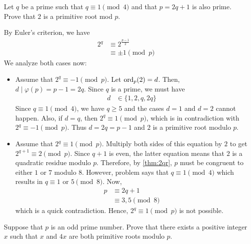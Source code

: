 \documentclass{subfile}
\begin{document}
	\begin{problem}
		Let $q$ be a prime such that $q\equiv 1\pmod 4$ and that $p=2q+1$ is also prime. Prove that $2$ is a primitive root mod $p$.
	\end{problem}

	\begin{solution}
		By Euler's criterion, we have
			\begin{align*}
				2^q
					& \equiv 2^{\frac{p-1}{2}}\\
					& \equiv \pm 1 \pmod{p}
			\end{align*}
		 We analyze both cases now:
			\begin{itemize}
				\item Assume that $2^q \equiv -1 \pmod p$. Let $\operatorname{ord}_p(2)=d$. Then, $d\mid \varphi(p)=p-1=2q$. Since $q$ is a prime, we must have
					\begin{align*}
						d
							& \in \{1,2,q,2q\}
					\end{align*}
				Since $q \equiv 1 \pmod 4$, we have $q \geq 5$ and the cases $d=1$ and $d=2$ cannot happen. Also, if $d=q$, then $2^q \equiv 1 \pmod p$, which is in contradiction with $2^q \equiv -1 \pmod p$. Thus $d=2q=p-1$ and $2$ is a primitive root modulo $p$.
				\item Assume that $2^q \equiv 1 \pmod{p}$. Multiply both sides of this equation by $2$ to get $2^{q+1} \equiv 2 \pmod p$. Since $q+1$ is even, the latter equation means that $2$ is a quadratic residue modulo $p$. Therefore, by \autoref{thm:2qr}, $p$ must be congruent to either $1$ or $7$ modulo $8$. However, problem says that $q \equiv 1 \pmod 4$ which results in $q \equiv 1$ or $5 \pmod 8$. Now,
					\begin{align*}
						p
							& \equiv 2q +1\\
							& \equiv 3,5 \pmod 8
					\end{align*}
				which is a quick contradiction. Hence, $2^q \equiv 1 \pmod{p}$ is not possible.
			\end{itemize}
	\end{solution}

	\begin{problem}
		Suppose that $p$ is an odd prime number. Prove that there exists a positive integer $x$ such that $x$ and $4x$ are both primitive roots modulo $p$.
	\end{problem}
\end{document}
